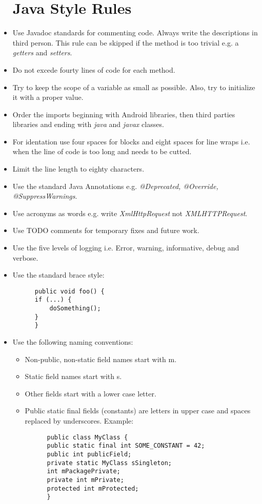 \begin{itemize}
  \section{Java Style Rules}
  \item Use Javadoc standards for commenting code. Always write the descriptions in third person. This rule can be skipped if the
  method is too trivial e.g. a \textit{getters} and \textit{setters}.
  \item Do not excede fourty lines of code for each method.
  \item Try to keep the scope of a variable as small as possible. Also, try to initialize it with a proper value. 
  \item Order the imports beginning with Android libraries, then third parties libraries and ending with \textit{java} and \textit{javax} classes.
  \item For identation use four spaces for blocks and eight spaces for line wraps i.e. when the line of code is too long and needs to be cutted.
  \item Limit the line length to eighty characters. 
  \item Use the standard Java Annotations e.g. \textit{@Deprecated, @Override, @SuppressWarnings}.
  \item Use acronyms as words e.g. write \textit{XmlHttpRequest} not \textit{XMLHTTPRequest}.
  \item Use TODO comments for temporary fixes and future work.
  \item Use the five levels of logging i.e. Error, warning, informative, debug and verbose.
  \item Use the standard brace style: 
  \begin{lstlisting}
      public void foo() {
	  if (...) {
	      doSomething();
	  }
      }
  \end{lstlisting}
  \item Use the following naming conventions:
  \begin{itemize}
    \item Non-public, non-static field names start with m.
    \item Static field names start with s.
    \item Other fields start with a lower case letter.
    \item Public static final fields (constants) are letters in upper case and spaces replaced by underscores.
    Example:
    \begin{lstlisting}
      public class MyClass {
	  public static final int SOME_CONSTANT = 42;
	  public int publicField;
	  private static MyClass sSingleton;
	  int mPackagePrivate;
	  private int mPrivate;
	  protected int mProtected;
      }
  \end{lstlisting}
  \end{itemize}

  
\end{itemize}


